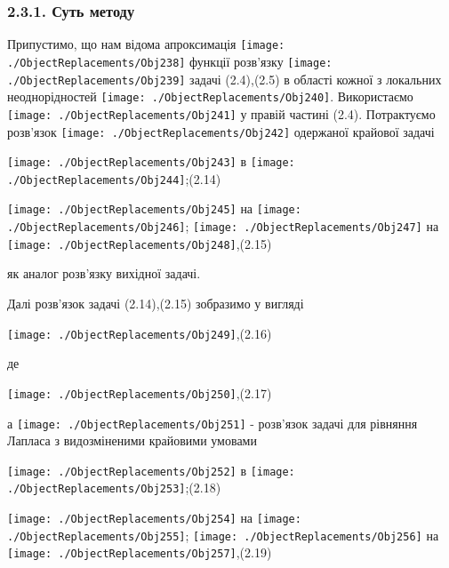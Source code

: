 \hypertarget{ux441ux443ux442ux44c-ux43cux435ux442ux43eux434ux443-1}{%
\subsubsection[2.3.1. Суть
методу]{\texorpdfstring{\protect\hypertarget{anchor-36}{}{}2.3.1. Суть
методу}{2.3.1. Суть методу}}\label{ux441ux443ux442ux44c-ux43cux435ux442ux43eux434ux443-1}}

Припустимо, що нам відома апроксимація
\texttt{[image: ./ObjectReplacements/Obj238]}
функції розв'язку
\texttt{[image: ./ObjectReplacements/Obj239]}
задачі (2.4),(2.5) в області кожної з локальних неоднорідностей
\texttt{[image: ./ObjectReplacements/Obj240]}.
Використаємо
\texttt{[image: ./ObjectReplacements/Obj241]}
у правій частині (2.4). Потрактуємо розв'язок
\texttt{[image: ./ObjectReplacements/Obj242]}
одержаної крайової задачі

\texttt{[image: ./ObjectReplacements/Obj243]}
в
\texttt{[image: ./ObjectReplacements/Obj244]};(2.14)

\texttt{[image: ./ObjectReplacements/Obj245]}
на
\texttt{[image: ./ObjectReplacements/Obj246]};
\texttt{[image: ./ObjectReplacements/Obj247]}
на
\texttt{[image: ./ObjectReplacements/Obj248]},(2.15)

як аналог розв'язку вихідної задачі.

Далі розв'язок задачі (2.14),(2.15) зобразимо у вигляді

\texttt{[image: ./ObjectReplacements/Obj249]},(2.16)

де

\texttt{[image: ./ObjectReplacements/Obj250]},(2.17)

а
\texttt{[image: ./ObjectReplacements/Obj251]}
- розв'язок задачі для рівняння Лапласа з видозміненими крайовими
умовами

\texttt{[image: ./ObjectReplacements/Obj252]}
в
\texttt{[image: ./ObjectReplacements/Obj253]};(2.18)

\texttt{[image: ./ObjectReplacements/Obj254]}
на
\texttt{[image: ./ObjectReplacements/Obj255]};
\texttt{[image: ./ObjectReplacements/Obj256]}
на
\texttt{[image: ./ObjectReplacements/Obj257]},(2.19)

